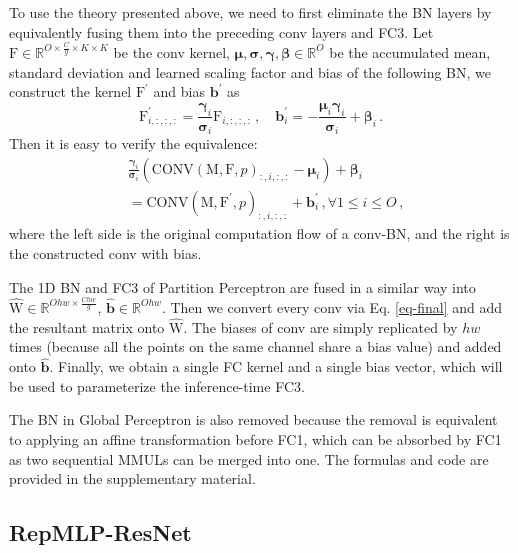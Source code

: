 \documentclass[10pt,twocolumn,letterpaper]{article}
\newcommand{\vect}[1]{\boldsymbol{\mathbf{#1}}}
\begin{document}
To use the theory presented above, we need to first eliminate the BN layers by equivalently fusing them into the preceding conv layers and FC3. Let $\mathrm{F}\in\mathbb{R}^{O\times \frac{C}{g}\times K\times K}$ be the conv kernel, $\vect{\mu},\vect{\sigma},\vect{\gamma},\vect{\beta}\in\mathbb{R}^{O}$ be the accumulated mean, standard deviation and learned scaling factor and bias of the following BN, we construct the kernel $\mathrm{F}^\prime$ and bias $\mathbf{b}^\prime$ as
\begin{equation}\label{eq-fuse-bn}
\mathrm{F}^\prime_{i,:,:,:} = \frac{\vect{\gamma}_i}{\vect{\sigma}_i}\mathrm{F}_{i,:,:,:} \,,\quad \mathbf{b}^\prime_i = -\frac{\vect{\mu}_i \vect{\gamma}_i}{\vect{\sigma}_i} + \vect{\beta}_i \,.
\end{equation}
Then it is easy to verify the equivalence:
\begin{equation}
\begin{aligned}
&\frac{\vect{\gamma}_i}{\vect{\sigma}_i}(\text{CONV}(\mathrm{M}, \mathrm{F}, p)_{:,i,:,:} - \vect{\mu}_i) + \vect{\beta}_i \\
&= \text{CONV}(\mathrm{M}, \mathrm{F}^\prime, p)_{:,i,:,:} + \mathbf{b}^\prime_i \,, \forall 1\leq i \leq O \,,
\end{aligned}
\end{equation}
where the left side is the original computation flow of a conv-BN, and the right is the constructed conv with bias.
 
The 1D BN and FC3 of Partition Perceptron are fused in a similar way into $\hat{\mathrm{W}}\in\mathbb{R}^{Ohw\times\frac{Chw}{g}}$, $\hat{\mathbf{b}}\in\mathbb{R}^{Ohw}$. Then we convert every conv via Eq. \ref{eq-final} and add the resultant matrix onto $\hat{\mathrm{W}}$. The biases of conv are simply replicated by $hw$ times (because all the points on the same channel share a bias value) and added onto $\hat{\mathbf{b}}$. Finally, we obtain a single FC kernel and a single bias vector, which will be used to parameterize the inference-time FC3.



The BN in Global Perceptron is also removed because the removal is equivalent to applying an affine transformation before FC1, which can be absorbed by FC1 as two sequential MMULs can be merged into one. The formulas and code are provided in the supplementary material.



\subsection{RepMLP-ResNet}
\end{document}
